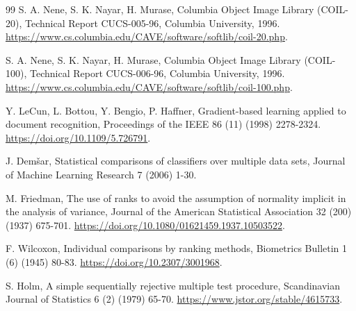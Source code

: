 \documentclass[preprint,12pt]{elsarticle}
\theoremstyle{remark}
\begin{document}
\begin{thebibliography}{99}
S. A. Nene, S. K. Nayar, H. Murase, Columbia Object Image Library (COIL-20),
Technical Report CUCS-005-96, Columbia University, 1996.
\url{https://www.cs.columbia.edu/CAVE/software/softlib/coil-20.php}.

S. A. Nene, S. K. Nayar, H. Murase, Columbia Object Image Library (COIL-100),
Technical Report CUCS-006-96, Columbia University, 1996.
\url{https://www.cs.columbia.edu/CAVE/software/softlib/coil-100.php}.

Y. LeCun, L. Bottou, Y. Bengio, P. Haffner, Gradient-based learning applied to document recognition,
Proceedings of the IEEE 86 (11) (1998) 2278-2324. \url{https://doi.org/10.1109/5.726791}.

J. Dem\v{s}ar, Statistical comparisons of classifiers over multiple data sets,
Journal of Machine Learning Research 7 (2006) 1-30.

M. Friedman, The use of ranks to avoid the assumption of normality implicit in the analysis of variance,
Journal of the American Statistical Association 32 (200) (1937) 675-701.
\url{https://doi.org/10.1080/01621459.1937.10503522}.

F. Wilcoxon, Individual comparisons by ranking methods,
Biometrics Bulletin 1 (6) (1945) 80-83. \url{https://doi.org/10.2307/3001968}.

S. Holm, A simple sequentially rejective multiple test procedure,
Scandinavian Journal of Statistics 6 (2) (1979) 65-70.
\url{https://www.jstor.org/stable/4615733}.

\end{thebibliography}
\end{document}
